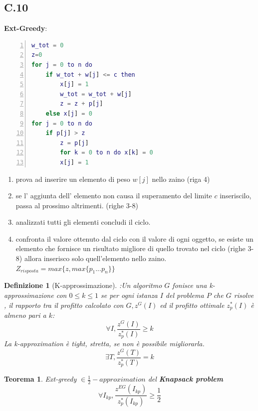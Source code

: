 \documentclass[a4paper]{article}
\newtheorem*{theorem}{Teorema}
\newtheorem*{definition}{Definizione}
\begin{document}
\subsection{C.10}
\textbf{Ext-Greedy}:
		\begin{lstlisting}[numbers=left,firstnumber=1,language=Matlab, stepnumber=1, xleftmargin=10pt]
w_tot = 0
z=0
for j = 0 to n do
	if w_tot + w[j] <= c then
		x[j] = 1
		w_tot = w_tot + w[j]
		z = z + p[j]
	else x[j] = 0
for j = 0 to n do
	if p[j] > z
		z = p[j]
		for k = 0 to n do x[k] = 0
		x[j] = 1
		\end{lstlisting}
		\begin{enumerate}
			\item prova ad inserire un elemento di peso $w[j]$ nello zaino (riga 4)
			\item se l' aggiunta dell' elemento non causa il superamento del limite $c$ inseriscilo, passa al prossimo altrimenti. (righe 3-8)
			\item analizzati tutti gli elementi concludi il ciclo.
			\item confronta il valore ottenuto dal ciclo con il valore di ogni oggetto, se esiste un elemento che fornisce un risultato migliore di quello trovato nel ciclo (righe 3-8) allora inserisco solo quell'elemento nello zaino. $Z_{risposta} = max\{z, max\{p_1 ... p_n\}\}$
		\end{enumerate}
		\begin{definition}[K-approssimazione]:Un algoritmo $G$ fonisce una \textit{k-approssimazione} con $0 \leq k \leq 1$ se per ogni istanza $I$ del problema $P$ che $G$ risolve , il rapporto tra il profitto calcolato con $G, z^G(I)$ ed il profitto ottimale $z^*_p(I)$ è almeno pari a $k$:
			$$\forall I, \frac{z^G(I)}{z^*_p(I)} \geq k$$
		La k-approximation è tight, stretta, se non è possibile migliorarla.
			$$\exists T, \frac{z^G(T)}{z^*_p(T)}=k$$
\end{definition}
\begin{theorem} Ext-greedy $\in \frac{1}{2}-approximation$ del \textbf{Knapsack problem}
$$\forall I_{kp}, \frac{z^{EG}(I_{kp})}{z^*_p(I_{kp})} \geq \frac{1}{2}$$
\end{theorem}
\end{document}
